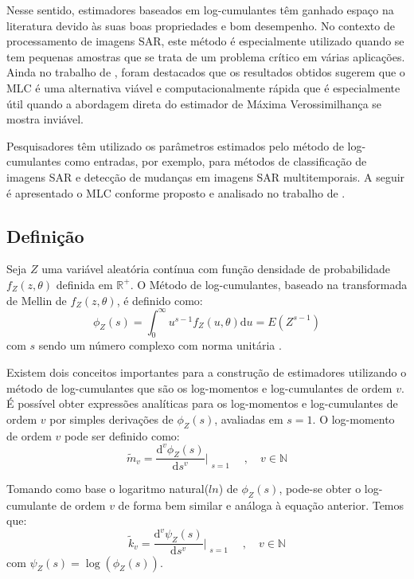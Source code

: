 Nesse sentido, estimadores baseados em log-cumulantes têm ganhado espaço na literatura devido às suas boas propriedades e bom desempenho. No contexto de processamento de imagens SAR, este método é especialmente utilizado quando se tem pequenas amostras que se trata de um problema crítico em várias aplicações. Ainda no trabalho de \citet{krylov2013}, foram destacados que os resultados obtidos sugerem que o MLC é uma alternativa viável e computacionalmente rápida que é especialmente útil quando a abordagem direta do estimador de Máxima Verossimilhança se mostra inviável. 

Pesquisadores têm utilizado os parâmetros estimados pelo método de log-cumulantes como entradas, por exemplo, para métodos de classificação de imagens SAR e detecção de mudanças em imagens SAR multitemporais. A seguir é apresentado o MLC conforme proposto e analisado no trabalho de \citet{nicolas2002}.

\subsection{Definição}

Seja $Z$ uma variável aleatória contínua com função densidade de probabilidade $f_Z(z, \theta)$ definida em $\mathbb{R}^{+}$. O Método de log-cumulantes, baseado na transformada de Mellin de $f_Z(z, \theta)$, é definido como:
\begin{equation}
    \phi_{Z}(s) = \int_{0}^{\infty} u^{s-1} f_{Z}(u, \theta)\mathrm{d}u = E(Z^{s-1}) \label{eq:logcum}
\end{equation}
com $s$ sendo um número complexo com norma unitária \citep{nicolas2002}.

Existem dois conceitos importantes para a construção de estimadores utilizando o método de log-cumulantes que são os log-momentos e log-cumulantes de ordem $v$. É possível obter expressões analíticas para os log-momentos e log-cumulantes de ordem $v$ por simples derivações de $\phi_{Z}(s)$, avaliadas em $s = 1$. O log-momento de ordem $v$ pode ser definido como:
\begin{equation}
    \widetilde{m}_{v} = \frac{\mathrm{d}^{v}\phi_{Z}(s)}{\mathrm{d}s^{v}}\Bigr|_{\substack{s=1}} \quad , \quad  v \in \mathbb{N}
    \label{eq:logmomV}
\end{equation}

Tomando como base o logaritmo natural($ln$) de $\phi_{Z}(s)$, pode-se obter o log-cumulante de ordem $v$ de forma bem similar e análoga à equação anterior. Temos que:
\begin{equation}
    \widetilde{k}_{v} = \frac{\mathrm{d}^{v}\psi_Z(s)}{\mathrm{d}s^{v}}\Bigr|_{\substack{s=1}} \quad , \quad  v \in \mathbb{N}
    \label{eq:logcumV}
\end{equation}
com $\psi_Z(s) = \log(\phi_{Z}(s))$.

